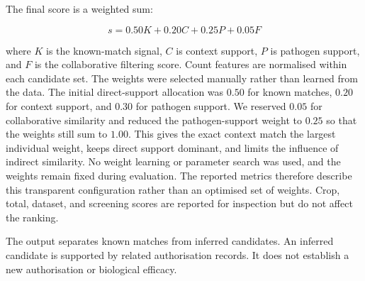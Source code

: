 The final score is a weighted sum:

\begin{equation}
    s = 0.50K + 0.20C + 0.25P + 0.05F
\end{equation}

where $K$ is the known-match signal, $C$ is context support, $P$ is pathogen support, and $F$ is the collaborative
filtering score. Count features are normalised within each candidate set. The weights were selected manually rather than
learned from the data. The initial direct-support allocation was $0.50$ for known matches, $0.20$ for context support,
and $0.30$ for pathogen support. We reserved $0.05$ for collaborative similarity and reduced the pathogen-support
weight to $0.25$ so that the weights still sum to $1.00$. This gives the exact context match the largest individual
weight, keeps direct support dominant, and limits the influence of indirect similarity. No weight learning or parameter
search was used, and the weights remain fixed during evaluation. The reported metrics therefore describe this transparent
configuration rather than an optimised set of weights. Crop, total, dataset, and screening scores are reported for
inspection but do not affect the ranking.

The output separates known matches from inferred candidates. An inferred candidate is supported by related
authorisation records. It does not establish a new authorisation or biological efficacy.
